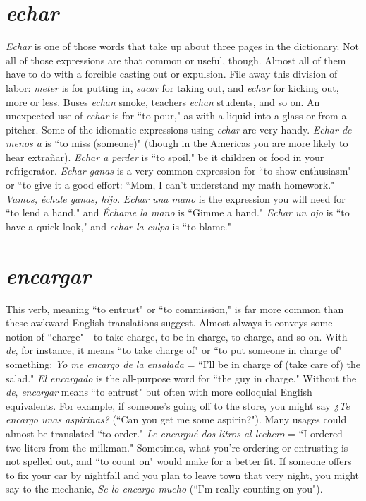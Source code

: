 \section{\emph{echar}}

\emph{Echar} is one of those words that take up about three pages in
the dictionary. Not all of those expressions are that common or useful,
though. Almost all of them have to do with a forcible casting out or
expulsion. File away this division of labor: \emph{meter} is for putting in, \emph{sacar} for taking out, and \emph{echar} for kicking out, more or less. Buses \emph{echan}
smoke, teachers \emph{echan} students, and so on. An unexpected use of
\emph{echar} is for ``to pour," as with a liquid into a glass or from a pitcher.
Some of the idiomatic expressions using \emph{echar} are very handy. \emph{Echar
de menos a} is ``to miss (someone)" (though in the Americas you are
more likely to hear extrañar). \emph{Echar a perder} is ``to spoil," be it children or food in your refrigerator. \emph{Echar ganas} is a very common
expression for ``to show enthusiasm" or ``to give it a good effort: ``Mom,
I can't understand my math homework." \emph{Vamos, échale ganas, hijo}.
\emph{Echar una mano} is the expression you will need for ``to lend a hand,"
and \emph{Échame la mano} is ``Gimme a hand." \emph{Echar un ojo} is ``to have a
quick look," and \emph{echar la culpa} is ``to blame."

\section{\emph{encargar}}

This verb, meaning ``to entrust" or ``to commission," is far
more common than these awkward English translations suggest. Almost always it conveys some notion of ``charge"---to take charge, to be
in charge, to charge, and so on. With \emph{de}, for instance, it means ``to take
charge of" or ``to put someone in charge of" something: \emph{Yo me encargo
de la ensalada} = ``I'll be in charge of (take care of) the salad." \emph{El encargado} is the all-purpose word for ``the guy in charge." Without the
\emph{de}, \emph{encargar} means ``to entrust" but often with more colloquial English equivalents. For example, if someone's going off to the store, you
might say \emph{¿Te encargo unas aspirinas?} (``Can you get me some aspirin?"). Many usages could almost be translated ``to order." \emph{Le encargué
dos litros al lechero} = ``I ordered two liters from the milkman." Sometimes, what you're ordering or entrusting is not spelled out, and ``to
count on" would make for a better fit. If someone offers to fix your car
by nightfall and you plan to leave town that very night, you might say
to the mechanic, \emph{Se lo encargo mucho} (``I'm really counting on you").

